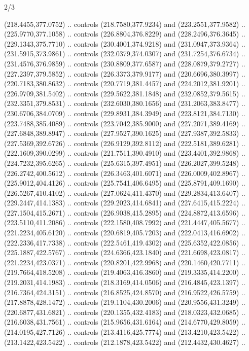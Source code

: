 \begin{flagdescription}{2/3}
\begin{scope}[shift={(0.5\flaglength,0.5)},scale=\flagwidth/545]
\begin{scope}[y=0.80pt, x=0.80pt, yscale=-1,shift={(-297,-430)}]
\begin{scope}[shift={(28.51887,-25.61095)}]
  (218.4455,377.0752) .. controls (218.7580,377.9234) and (223.2551,377.9582) ..
  (225.9770,377.1058) .. controls (226.8804,376.8229) and (228.2496,376.3645) ..
  (229.1343,375.7710) .. controls (230.4001,374.9218) and (231.0947,373.9364) ..
  (231.5915,373.9861) .. controls (232.0379,374.0307) and (231.7254,376.6734) ..
  (231.4576,376.9859) .. controls (230.8809,377.6587) and (228.0879,379.2727) ..
  (227.2397,379.5852) .. controls (226.3373,379.9177) and (220.6696,380.3997) ..
  (220.7183,380.8632) .. controls (220.7719,381.4457) and (224.2012,381.9201) ..
  (226.9709,381.5402) .. controls (229.5622,381.1848) and (232.0852,379.5615) ..
  (232.3351,379.8531) .. controls (232.6030,380.1656) and (231.2063,383.8477) ..
  (230.6706,384.0709) .. controls (229.8931,384.3949) and (223.8121,384.7130) ..
  (223.7488,385.4089) .. controls (223.7042,385.9000) and (227.2071,389.4169) ..
  (227.6848,389.8947) .. controls (227.9527,390.1625) and (227.9387,392.5833) ..
  (227.5369,392.6726) .. controls (226.9129,392.8112) and (222.5181,389.6281) ..
  (222.1609,390.0299) .. controls (221.7511,390.4910) and (223.4401,392.9868) ..
  (224.7232,395.6265) .. controls (225.6315,397.4951) and (226.2027,399.5248) ..
  (226.2742,400.5612) .. controls (226.3463,401.6071) and (226.0009,402.8967) ..
  (225.9012,404.4126) .. controls (225.7541,406.6495) and (225.8791,409.1690) ..
  (226.5267,410.4102) .. controls (227.0624,411.4370) and (229.2834,413.6407) ..
  (229.2447,414.1383) .. controls (229.2023,414.6841) and (227.6415,415.2224) ..
  (227.1504,415.2671) .. controls (226.9038,415.2895) and (224.8872,413.6596) ..
  (223.5110,411.2086) .. controls (222.1580,408.7992) and (221.4447,405.5677) ..
  (221.2234,405.6120) .. controls (220.6819,405.7203) and (222.0413,416.6902) ..
  (222.2336,417.7338) .. controls (222.5461,419.4302) and (225.6352,422.0856) ..
  (225.1887,422.5767) .. controls (224.6366,423.1840) and (221.6698,423.0817) ..
  (221.2234,423.0371) .. controls (220.8201,422.9968) and (220.1460,420.7711) ..
  (219.7664,418.5208) .. controls (219.4063,416.3860) and (219.3335,414.2200) ..
  (219.2031,414.1983) .. controls (218.3169,414.0506) and (216.4845,423.1397) ..
  (216.7364,424.3151) .. controls (216.8525,424.8570) and (216.9522,426.5759) ..
  (217.8878,428.1472) .. controls (219.1104,430.2006) and (220.9556,431.3249) ..
  (220.6877,431.6821) .. controls (220.1355,432.4183) and (218.0323,432.0685) ..
  (216.6038,431.7561) .. controls (215.9656,431.6164) and (214.6770,429.8059) ..
  (214.0195,427.7126) .. controls (213.4116,425.7774) and (213.4210,423.5422) ..
  (213.1422,423.5422) .. controls (212.1878,423.5422) and (212.4432,430.4627) ..

\end{scope}
\end{scope}
\end{scope}
\end{flagdescription}
